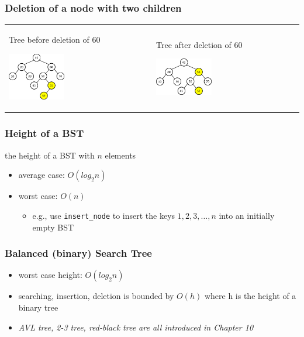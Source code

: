 \documentclass[newPxFont,sthlmFooter,nooffset]{beamer}
\begin{document}
\begin{frame}[t]
  \frametitle{Deletion of a node with two children}
  \begin{tabular}{p{} p{}}
Tree before deletion of 60

    \includegraphics[width=0.4\textwidth]{./figures/fig17_bst_delete3.png}
&
Tree after deletion of 60

    \includegraphics[width=0.4\textwidth]{./figures/fig17_bst_delete4.png}
\\
  \end{tabular}
\end{frame}


\begin{frame}[t]
  \frametitle{Height of a BST}
the height of a BST with $n$ elements 
\begin{itemize}
\item average case: $O(log_2n)$
\item worst case: $O(n)$
  \begin{itemize}
  \item e.g., use \texttt{insert\_node} to insert the keys $1, 2, 3, \ldots, n$ into an
    initially empty BST
  \end{itemize}

\end{itemize}

\end{frame}


\begin{frame}[t]
  \frametitle{Balanced (binary) Search Tree}
  \begin{itemize}
  \item worst case height: $O(log_2n)$
  \item searching, insertion, deletion is bounded by $O(h)$ where h is
    the height of a binary tree
  \item \textit{AVL tree, 2-3 tree, red-black tree
    are all introduced in Chapter 10}
  \end{itemize}
\end{frame}
\end{document}
